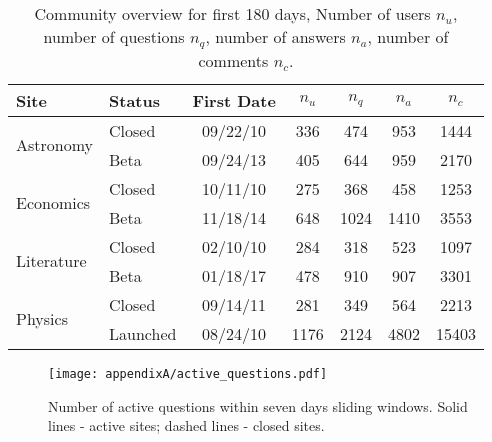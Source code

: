 \begin{table}[h]
	\centering
	\caption[Community overview for first 180 days.]{Community overview for first 180 days, Number of users $n_u$, number of questions $n_q$, number of answers $n_a$, number of comments $n_c$.}
	\label{tab:site-info}
	\begin{tabular}{llccccc}
		\toprule
		Site                 & Status                           & First Date                     & $n_u$                    & $n_q$                & $n_a$                  & $n_c$ \\ \hline
		\multirow{2}{*}{Astronomy}  & \multicolumn{1}{l|}{Closed}      & \multicolumn{1}{c|}{09/22/10} & \multicolumn{1}{c|}{336}  & \multicolumn{1}{c|}{474}  & \multicolumn{1}{c|}{953}  & 1444     \\
		& \multicolumn{1}{l|}{Beta} & \multicolumn{1}{c|}{09/24/13} & \multicolumn{1}{c|}{405}  & \multicolumn{1}{c|}{644}  & \multicolumn{1}{c|}{959}  & 2170     \\ \hline
		\multirow{2}{*}{Economics}  & \multicolumn{1}{l|}{Closed}      & \multicolumn{1}{c|}{10/11/10} & \multicolumn{1}{c|}{275}  & \multicolumn{1}{c|}{368}  & \multicolumn{1}{c|}{458}  & 1253     \\
		& \multicolumn{1}{l|}{Beta} & \multicolumn{1}{c|}{11/18/14} & \multicolumn{1}{c|}{648}  & \multicolumn{1}{c|}{1024} & \multicolumn{1}{c|}{1410} & 3553     \\ \hline
		\multirow{2}{*}{Literature} & \multicolumn{1}{l|}{Closed}      & \multicolumn{1}{c|}{02/10/10} & \multicolumn{1}{c|}{284}  & \multicolumn{1}{c|}{318}  & \multicolumn{1}{c|}{523}  & 1097     \\
		& \multicolumn{1}{l|}{Beta} & \multicolumn{1}{c|}{01/18/17} & \multicolumn{1}{c|}{478}  & \multicolumn{1}{c|}{910}  & \multicolumn{1}{c|}{907}  & 3301     \\ \hline
		\multirow{2}{*}{Physics}    & \multicolumn{1}{l|}{Closed}      & \multicolumn{1}{c|}{09/14/11} & \multicolumn{1}{c|}{281}  & \multicolumn{1}{c|}{349}  & \multicolumn{1}{c|}{564}  & 2213     \\
		& \multicolumn{1}{l|}{Launched}    & \multicolumn{1}{c|}{08/24/10} & \multicolumn{1}{c|}{1176} & \multicolumn{1}{c|}{2124} & \multicolumn{1}{c|}{4802} & 15403    \\
		\bottomrule
	\end{tabular}
\end{table}


\begin{figure}
	\centering
	\texttt{[image: appendixA/active\_questions.pdf]}
	\caption[Number of active questions within seven days sliding windows.]{Number of active questions within seven days sliding windows. Solid lines - active sites; dashed lines - closed sites.}
	\label{fig:active_questions}
\end{figure}

